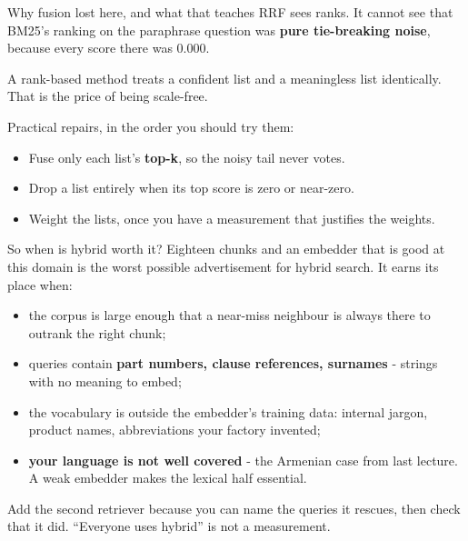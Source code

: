 \documentclass[aspectratio=169]{beamer}
\newcommand{\trapbox}[1]{%
  \begin{tcolorbox}[colback=armred!8, colframe=armred, boxrule=0.6pt, arc=2pt]
  #1
  \end{tcolorbox}}
\newcommand{\takebox}[1]{%
  \begin{tcolorbox}[colback=paramgreen!8, colframe=paramgreen, boxrule=0.6pt, arc=2pt]
  #1
  \end{tcolorbox}}
\begin{document}
\begin{frame}{Why fusion lost here, and what that teaches}
  \vspace{0.5em}
  RRF sees ranks. It cannot see that BM25's ranking on the paraphrase question was
  \textbf{pure tie-breaking noise}, because every score there was 0.000.

  \vspace{0.8em}
  \trapbox{A rank-based method treats a confident list and a meaningless list identically.
  That is the price of being scale-free.}

  \vspace{0.8em}
  Practical repairs, in the order you should try them:

  \vspace{0.4em}
  \begin{itemize}
    \item {\small Fuse only each list's \textbf{top-k}, so the noisy tail never votes.}
    \item {\small Drop a list entirely when its top score is zero or near-zero.}
    \item {\small Weight the lists, once you have a measurement that justifies the weights.}
  \end{itemize}
\end{frame}

\begin{frame}{So when is hybrid worth it?}
  \vspace{0.3em}
  Eighteen chunks and an embedder that is good at this domain is the worst possible
  advertisement for hybrid search. It earns its place when:

  \vspace{0.5em}
  \begin{itemize}
    \item {\small the corpus is large enough that a near-miss neighbour is always there to
      outrank the right chunk;}
    \item {\small queries contain \textbf{part numbers, clause references, surnames} - strings
      with no meaning to embed;}
    \item {\small the vocabulary is outside the embedder's training data: internal jargon,
      product names, abbreviations your factory invented;}
    \item {\small \textbf{your language is not well covered} - the Armenian case from last
      lecture. A weak embedder makes the lexical half essential.}
  \end{itemize}

  \vspace{0.7em}
  \takebox{Add the second retriever because you can name the queries it rescues, then check
  that it did. ``Everyone uses hybrid'' is not a measurement.}
\end{frame}
\end{document}
